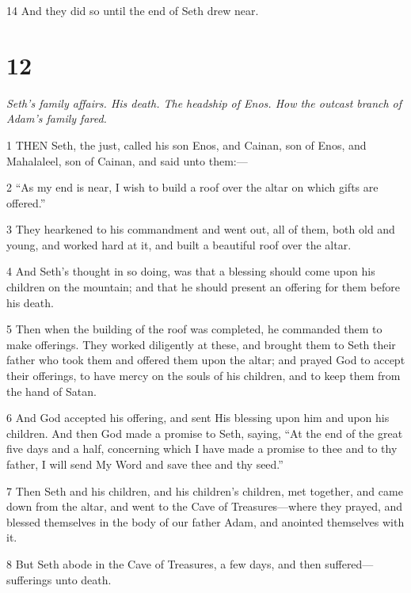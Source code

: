 \par 14 And they did so until the end of Seth drew near.

\chapter{12}

\par \textit{Seth's family affairs. His death. The headship of Enos. How the outcast branch of Adam's family fared.}

\par 1 THEN Seth, the just, called his son Enos, and Cainan, son of Enos, and Mahalaleel, son of Cainan, and said unto them:—

\par 2 “As my end is near, I wish to build a roof over the altar on which gifts are offered.”

\par 3 They hearkened to his commandment and went out, all of them, both old and young, and worked hard at it, and built a beautiful roof over the altar.

\par 4 And Seth's thought in so doing, was that a blessing should come upon his children on the mountain; and that he should present an offering for them before his death.

\par 5 Then when the building of the roof was completed, he commanded them to make offerings. They worked diligently at these, and brought them to Seth their father who took them and offered them upon the altar; and prayed God to accept their offerings, to have mercy on the souls of his children, and to keep them from the hand of Satan.

\par 6 And God accepted his offering, and sent His blessing upon him and upon his children. And then God made a promise to Seth, saying, “At the end of the great five days and a half, concerning which I have made a promise to thee and to thy father, I will send My Word and save thee and thy seed.”

\par 7 Then Seth and his children, and his children's children, met together, and came down from the altar, and went to the Cave of Treasures—where they prayed, and blessed themselves in the body of our father Adam, and anointed themselves with it.

\par 8 But Seth abode in the Cave of Treasures, a few days, and then suffered—sufferings unto death.

